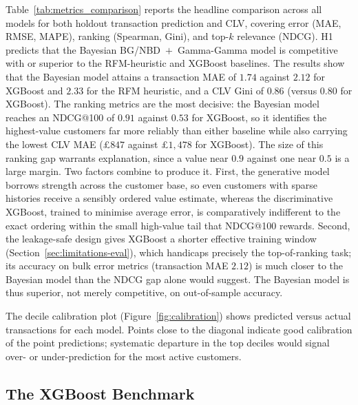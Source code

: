 Table~\ref{tab:metrics_comparison} reports the headline comparison across all models for both holdout transaction prediction and CLV, covering error (MAE, RMSE, MAPE), ranking (Spearman, Gini), and top-$k$ relevance (NDCG). H1 predicts that the Bayesian BG/NBD~$+$~Gamma-Gamma model is competitive with or superior to the RFM-heuristic and XGBoost baselines. The results show that the Bayesian model attains a transaction MAE of $1.74$ against $2.12$ for XGBoost and $2.33$ for the RFM heuristic, and a CLV Gini of $0.86$ (versus $0.80$ for XGBoost). The ranking metrics are the most decisive: the Bayesian model reaches an NDCG@100 of $0.91$ against $0.53$ for XGBoost, so it identifies the highest-value customers far more reliably than either baseline while also carrying the lowest CLV MAE (\pounds$847$ against \pounds$1{,}478$ for XGBoost). The size of this ranking gap warrants explanation, since a value near $0.9$ against one near $0.5$ is a large margin. Two factors combine to produce it. First, the generative model borrows strength across the customer base, so even customers with sparse histories receive a sensibly ordered value estimate, whereas the discriminative XGBoost, trained to minimise average error, is comparatively indifferent to the exact ordering within the small high-value tail that NDCG@100 rewards. Second, the leakage-safe design gives XGBoost a shorter effective training window (Section~\ref{sec:limitations-eval}), which handicaps precisely the top-of-ranking task; its accuracy on bulk error metrics (transaction MAE $2.12$) is much closer to the Bayesian model than the NDCG gap alone would suggest. The Bayesian model is thus superior, not merely competitive, on out-of-sample accuracy.


The decile calibration plot (Figure~\ref{fig:calibration}) shows predicted versus actual transactions for each model. Points close to the diagonal indicate good calibration of the point predictions; systematic departure in the top deciles would signal over- or under-prediction for the most active customers.


\subsection{The XGBoost Benchmark}
\label{sec:results-xgboost}

